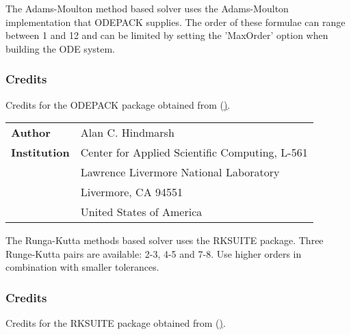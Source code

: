 \label{subsec:LSODEAM}
The Adams-Moulton method based solver uses the Adams-Moulton implementation that ODEPACK supplies. The order of these formulae can range between 1 and 12 and can be limited by setting the 'MaxOrder' option when building the ODE system.
\subsubsection{Credits}
Credits for the ODEPACK package obtained from (\hyperlink{http://www.netlib.org/}).

\vspace{0.5cm}
\begin{tabular}{ l l }
 \textbf{Author}      & Alan C. Hindmarsh \\
 \textbf{Institution} & Center for Applied Scientific Computing, L-561 \\
                      & Lawrence Livermore National Laboratory \\
                      & Livermore, CA 94551 \\
                      & United States of America \\
\end{tabular}

\label{subsec:RKSUITE}
The Runga-Kutta methods based solver uses the RKSUITE package. Three Runge-Kutta pairs are available: 2-3, 4-5 and 7-8. Use higher orders in combination with smaller tolerances.
\subsubsection{Credits}
Credits for the RKSUITE package obtained from (\hyperlink{http://www.netlib.org/}).

